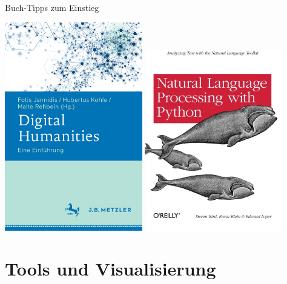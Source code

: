 \documentclass[10pt]{beamer}
\begin{document}
\begin{frame}{Buch-Tipps zum Einstieg}

\href{https://www.springer.com/de/book/9783476026224}{\includegraphics[width=0.45\textwidth]{dh-einf.png}}
\hspace{2em}
\href{https://www.nltk.org/book/}{
\includegraphics[width=0.45\textwidth]{nltk-buch-python.jpg}
}
\end{frame}


\section{Tools und Visualisierung}
\end{document}
